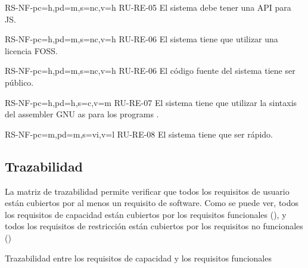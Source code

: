 \begin{softwareReq}{RS-NF-}{pc=h,pd=m,s=nc,v=h}
    {RU-RE-05}
    El sistema debe tener una \gls{API} para \gls{JS}.
\end{softwareReq}

\begin{softwareReq}{RS-NF-}{pc=h,pd=m,s=nc,v=h}
    {RU-RE-06}
    El sistema tiene que utilizar una licencia \gls{FOSS}.
\end{softwareReq}

\begin{softwareReq}{RS-NF-}{pc=h,pd=m,s=nc,v=h}
    {RU-RE-06}
    El código fuente del sistema tiene ser público.
\end{softwareReq}

\begin{softwareReq}{RS-NF-}{pc=h,pd=h,s=c,v=m}
    {RU-RE-07}
    El sistema tiene que utilizar la sintaxis del \gls{assembler} GNU as para
    los \glspl{program} .
\end{softwareReq}

\begin{softwareReq}{RS-NF-}{pc=m,pd=m,s=vi,v=l}
    {RU-RE-08}
    El sistema tiene que ser rápido. %
\end{softwareReq}

\FloatBarrier


\subsection{Trazabilidad}\label{subsec:trazability}

La matriz de trazabilidad permite verificar que todos los requisitos de usuario
están cubiertos por al menos un requisito de software. Como se puede ver, todos
los requisitos de capacidad están cubiertos por los requisitos funcionales
(), y todos los requisitos de restricción están
cubiertos por los requisitos no funcionales ()

    {Trazabilidad entre los requisitos de capacidad y los requisitos funcionales}


